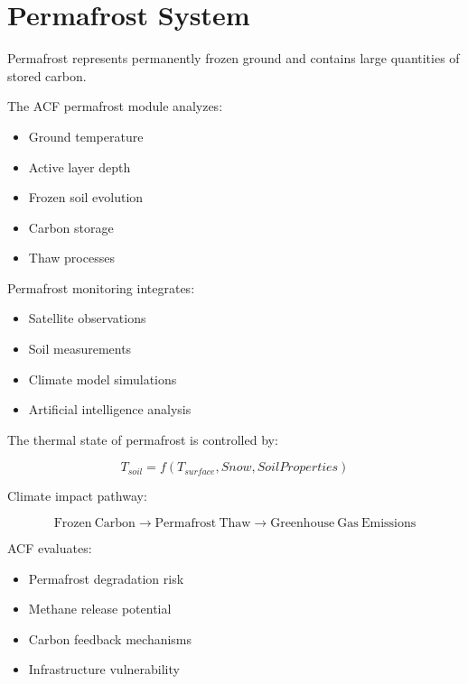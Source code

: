 \section{Permafrost System}


Permafrost represents permanently frozen ground and contains
large quantities of stored carbon.



The ACF permafrost module analyzes:


\begin{itemize}

\item Ground temperature

\item Active layer depth

\item Frozen soil evolution

\item Carbon storage

\item Thaw processes

\end{itemize}



Permafrost monitoring integrates:


\begin{itemize}

\item Satellite observations

\item Soil measurements

\item Climate model simulations

\item Artificial intelligence analysis

\end{itemize}



The thermal state of permafrost is controlled by:


\[
T_{soil}=f(T_{surface},Snow,SoilProperties)
\]



Climate impact pathway:


\[
\mathrm{Frozen\ Carbon}
\rightarrow
\mathrm{Permafrost\ Thaw}
\rightarrow
\mathrm{Greenhouse\ Gas\ Emissions}
\]



ACF evaluates:


\begin{itemize}

\item Permafrost degradation risk

\item Methane release potential

\item Carbon feedback mechanisms

\item Infrastructure vulnerability

\end{itemize}
